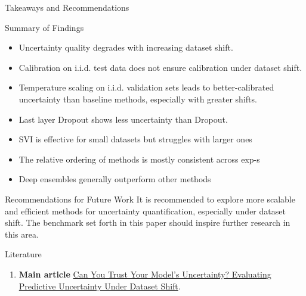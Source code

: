 \documentclass{beamer}
\begin{document}
\begin{frame}{Takeaways and Recommendations}
    \begin{block}{Summary of Findings}
    \begin{itemize}
        \item Uncertainty quality degrades with increasing dataset shift.
        \item Calibration on i.i.d. test data does not ensure calibration under dataset shift.
        \item Temperature scaling on i.i.d. validation sets leads to better-calibrated uncertainty than baseline methods, especially with greater shifts.
        \item Last layer Dropout shows less uncertainty %
        than Dropout.
        \item SVI is effective for small datasets but struggles with larger ones
        \item The relative ordering of methods is mostly consistent across exp-s %
        \item Deep ensembles generally outperform other methods%
    \end{itemize}
    \end{block}
    \begin{block}{Recommendations for Future Work}
    It is recommended to explore more scalable and efficient methods for uncertainty quantification, especially under dataset shift. The benchmark set forth in this paper should inspire further research in this area.
    \end{block}
\end{frame}

\begin{frame}{Literature}
    \begin{enumerate}
        \item \textbf{Main article} \href{https://arxiv.org/pdf/1704.01168.pdf}
        {Can You Trust Your Model’s Uncertainty? Evaluating Predictive Uncertainty Under Dataset Shift}.
    \end{enumerate}
\end{frame}
\end{document}
